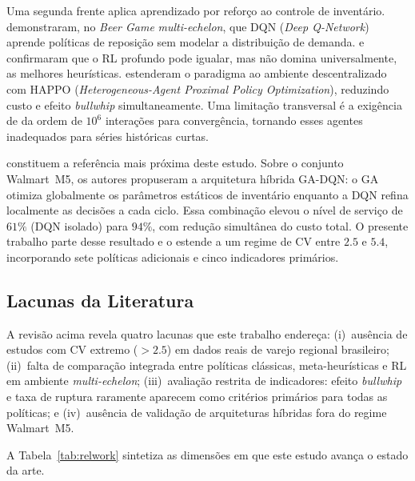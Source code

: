 \documentclass[a4paper,11pt]{article}
\begin{document}
Uma segunda frente aplica aprendizado por reforço ao controle de
inventário. \citet{oroojlooyjadid:2022} demonstraram, no \textit{Beer
Game} \textit{multi-echelon}, que DQN (\textit{Deep Q-Network}) aprende
políticas de reposição sem modelar a distribuição de demanda.
\citet{gijsbrechts:2022} e \citet{vanvuchelen:2020} confirmaram que o
RL profundo pode igualar, mas não domina universalmente, as melhores
heurísticas. \citet{liu:2024} estenderam o paradigma ao ambiente
descentralizado com HAPPO (\textit{Heterogeneous-Agent Proximal Policy
Optimization}), reduzindo custo e efeito \textit{bullwhip}
simultaneamente. Uma limitação transversal é a exigência de da ordem
de $10^6$ interações para convergência, tornando esses agentes
inadequados para séries históricas curtas.

\citet{zabraoui:2025} constituem a referência mais próxima deste
estudo. Sobre o conjunto Walmart~M5, os autores propuseram a
arquitetura híbrida GA-DQN: o GA otimiza globalmente os parâmetros
estáticos de inventário enquanto a DQN refina localmente as decisões
a cada ciclo. Essa combinação elevou o nível de serviço de $61\%$
(DQN isolado) para $94\%$, com redução simultânea do custo total.
O presente trabalho parte desse resultado e o estende a um regime
de CV entre $2.5$ e $5.4$, incorporando sete políticas adicionais
e cinco indicadores primários.

\subsection{Lacunas da Literatura}

A revisão acima revela quatro lacunas que este trabalho endereça:
(i)~ausência de estudos com CV extremo ($>2.5$) em dados reais de
varejo regional brasileiro; (ii)~falta de comparação integrada entre
políticas clássicas, meta-heurísticas e RL em ambiente
\textit{multi-echelon}; (iii)~avaliação restrita de indicadores:
efeito \textit{bullwhip} e taxa de ruptura raramente aparecem como
critérios primários para todas as políticas; e (iv)~ausência de
validação de arquiteturas híbridas fora do regime Walmart~M5.

A Tabela~\ref{tab:relwork} sintetiza as dimensões em que este
estudo avança o estado da arte.
\end{document}
